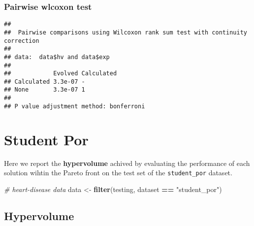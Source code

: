 \documentclass[
]{book}
\newenvironment{Shaded}{\begin{snugshade}}{\end{snugshade}}
\newcommand{\AttributeTok}[1]{\textcolor[rgb]{0.13,0.29,0.53}{#1}}
\newcommand{\CommentTok}[1]{\textcolor[rgb]{0.56,0.35,0.01}{\textit{#1}}}
\newcommand{\ConstantTok}[1]{\textcolor[rgb]{0.56,0.35,0.01}{#1}}
\newcommand{\FunctionTok}[1]{\textcolor[rgb]{0.13,0.29,0.53}{\textbf{#1}}}
\newcommand{\NormalTok}[1]{#1}
\newcommand{\OtherTok}[1]{\textcolor[rgb]{0.56,0.35,0.01}{#1}}
\newcommand{\SpecialCharTok}[1]{\textcolor[rgb]{0.81,0.36,0.00}{\textbf{#1}}}
\newcommand{\StringTok}[1]{\textcolor[rgb]{0.31,0.60,0.02}{#1}}
\begin{document}
\hypertarget{pairwise-wlcoxon-test-1}{%
\subsection{Pairwise wlcoxon test}\label{pairwise-wlcoxon-test-1}}

\begin{Shaded}
\end{Shaded}

\begin{verbatim}
## 
##  Pairwise comparisons using Wilcoxon rank sum test with continuity correction 
## 
## data:  data$hv and data$exp 
## 
##            Evolved Calculated
## Calculated 3.3e-07 -         
## None       3.3e-07 1         
## 
## P value adjustment method: bonferroni
\end{verbatim}

\hypertarget{student-por}{%
\chapter{Student Por}\label{student-por}}

Here we report the \textbf{hypervolume} achived by evaluating the performance of each solution wihtin the Pareto front on the test set of the \texttt{student\_por} dataset.

\begin{Shaded}
\begin{Highlighting}[]
\CommentTok{\# heart{-}disease data}
\NormalTok{data }\OtherTok{\textless{}{-}} \FunctionTok{filter}\NormalTok{(testing, dataset }\SpecialCharTok{==} \StringTok{"student\_por"}\NormalTok{)}
\end{Highlighting}
\end{Shaded}

\hypertarget{hypervolume-2}{%
\section{Hypervolume}\label{hypervolume-2}}
\end{document}
